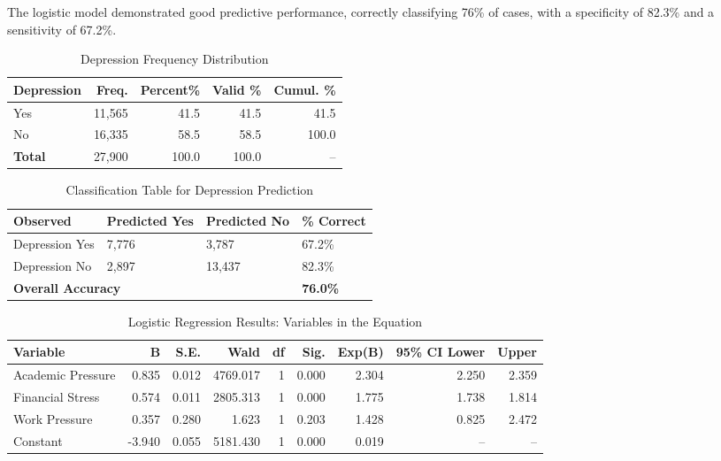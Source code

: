 \documentclass[conference]{IEEEtran}
\begin{document}
The logistic model demonstrated good predictive performance, correctly classifying 76\% of cases, with a specificity of 82.3\% and a sensitivity of 67.2\%.


\begin{table}[htbp]
\caption{Depression Frequency Distribution}
\centering
\begin{tabular}{|p{1.5cm}|r|r|r|r|}
\hline
\textbf{Depression} & \textbf{Freq.} & \textbf{Percent\%} & \textbf{Valid \%} & \textbf{Cumul. \%} \\
\hline
Yes & 11,565 & 41.5 & 41.5 & 41.5 \\
No  & 16,335 & 58.5 & 58.5 & 100.0 \\
\hline
\textbf{Total} & 27,900 & 100.0 & 100.0 & -- \\
\hline
\end{tabular}
\label{tab:depression-frequency}
\end{table}


\begin{table}[htbp]
\caption{Classification Table for Depression Prediction}
\centering
\begin{tabular}{|p{2cm}|p{1.1cm}|p{1.1cm}|p{1.4cm}|}
\hline
\textbf{Observed} & \textbf{Predicted Yes} & \textbf{Predicted No} & \textbf{\% Correct} \\
\hline
Depression Yes & 7,776 & 3,787 & 67.2\% \\
Depression No  & 2,897 & 13,437 & 82.3\% \\
\hline
\multicolumn{3}{|l|}{\textbf{Overall Accuracy}} & \textbf{76.0\%} \\
\hline
\end{tabular}
\label{tab:classification}
\end{table}


\begin{table*}[htbp]
\caption{Logistic Regression Results: Variables in the Equation}
\centering
\begin{tabular}{|l|r|r|r|r|r|r|r|r|}
\hline
\textbf{Variable} & \textbf{B} & \textbf{S.E.} & \textbf{Wald} & \textbf{df} & \textbf{Sig.} & \textbf{Exp(B)} & \textbf{95\% CI Lower} & \textbf{Upper} \\
\hline
Academic Pressure & 0.835 & 0.012 & 4769.017 & 1 & 0.000 & 2.304 & 2.250 & 2.359 \\
Financial Stress  & 0.574 & 0.011 & 2805.313 & 1 & 0.000 & 1.775 & 1.738 & 1.814 \\
Work Pressure     & 0.357 & 0.280 & 1.623    & 1 & 0.203 & 1.428 & 0.825 & 2.472 \\
Constant          & -3.940 & 0.055 & 5181.430 & 1 & 0.000 & 0.019 & --    & --    \\
\hline
\end{tabular}
\label{tab:variables-in-equation}
\end{table*}
\end{document}
